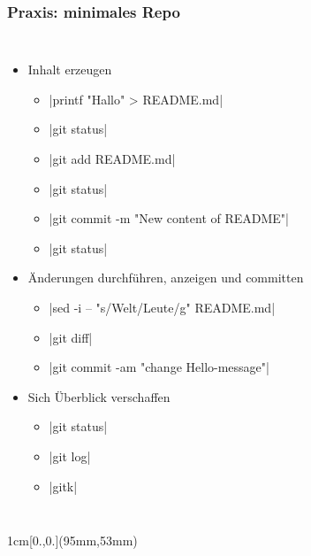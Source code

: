 \documentclass{beamer}
\begin{document}
\begin{frame}[fragile,label=gitintro40]
\frametitle{Praxis: minimales Repo}
\vspace{-5mm}
\begin{columns}
\begin{itemize}
 \item Inhalt erzeugen
\begin{itemize}
 \item \cverb|printf "Hallo\nWelt\n" > README.md|
 \item \cverb|git status|
 \item \cverb|git add README.md| \qquad {}
 \item \cverb|git status|
 \item \cverb|git commit -m "New content of README"| %
 \item \cverb|git status|
\end{itemize}
\pause
 \item Änderungen durchführen, anzeigen und committen
\begin{itemize}
 \item \cverb|sed -i -- "s/Welt/Leute/g" README.md|
 \item \cverb|git diff|
 \pause
 \pause
 \item \cverb|git commit -am "change Hello-message"|
\end{itemize}
 \pause
 \item Sich Überblick verschaffen
 \begin{itemize}
 \item \cverb|git status|
 \item \cverb|git log|
 \item \cverb|gitk|
 \end{itemize}
\end{itemize}

~
\end{columns}


\begin{textblock*}{1cm}[0.,0.](95mm,53mm)
\end{textblock*}

\end{frame}
\end{document}
